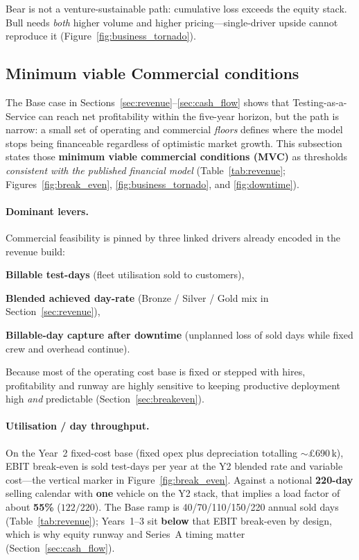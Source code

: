 Bear is not a venture-sustainable path: cumulative loss exceeds the
\totalRaise{} equity stack. Bull needs \emph{both} higher volume and
higher pricing---single-driver upside cannot reproduce it
(Figure~\ref{fig:business_tornado}).

\subsection{Minimum viable Commercial conditions}
\label{sec:mvc_conditions}

The Base case in Sections~\ref{sec:revenue}--\ref{sec:cash_flow} shows that
Testing-as-a-Service can reach net profitability within the five-year horizon,
but the path is narrow: a small set of operating and commercial \emph{floors}
defines where the model stops being financeable regardless of optimistic
market growth. This subsection states those \textbf{minimum viable commercial
conditions (MVC)} as thresholds \emph{consistent with the published financial
model} (Table~\ref{tab:revenue}; Figures~\ref{fig:break_even},
\ref{fig:business_tornado}, and \ref{fig:downtime}).

\paragraph{Dominant levers.}
Commercial feasibility is pinned by three linked drivers already encoded in
the revenue build:
\begin{tightitemize}
  \item \textbf{Billable test-days} (fleet utilisation sold to customers),
  \item \textbf{Blended achieved day-rate} (Bronze / Silver / Gold mix
        in Section~\ref{sec:revenue}),
  \item \textbf{Billable-day capture after downtime} (unplanned loss of sold
        days while fixed crew and overhead continue).
\end{tightitemize}
Because most of the operating cost base is fixed or stepped with hires,
profitability and runway are highly sensitive to keeping productive deployment
high \emph{and} predictable (Section~\ref{sec:breakeven}).

\paragraph{Utilisation / day throughput.}
On the Year~2 fixed-cost base (fixed opex plus depreciation totalling
$\sim$\pounds690\,k), EBIT break-even is \breakEvenDays{} sold test-days per
year at the Y2 blended rate and variable cost---the vertical marker in
Figure~\ref{fig:break_even}. Against a notional \textbf{220-day} selling
calendar with \textbf{one} vehicle on the Y2 stack, that implies a load factor
of about \textbf{55\%} ($122/220$). The Base ramp is 40/70/110/150/220 annual
sold days (Table~\ref{tab:revenue}); Years~1--3 sit \textbf{below} that EBIT
break-even by design, which is why equity runway and Series~A timing matter
(Section~\ref{sec:cash_flow}).

